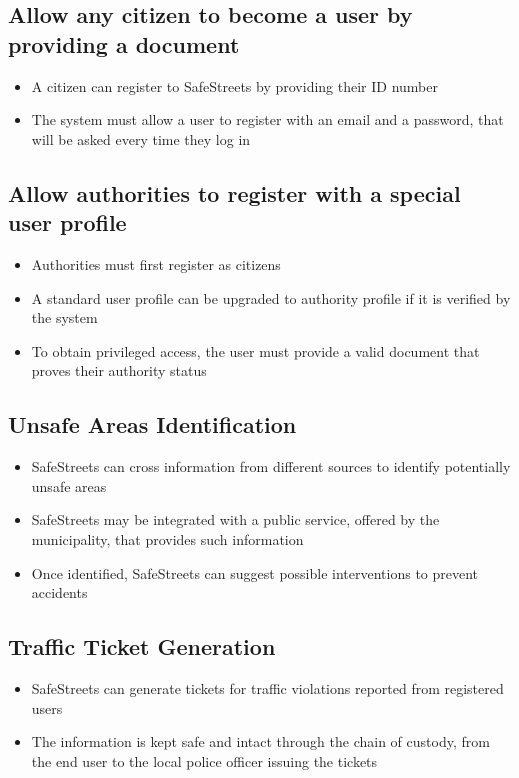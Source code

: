 \subsection{Allow any citizen to become a user by providing a document}
\begin{itemize}
    \item A citizen can register to SafeStreets by providing their ID number
    \item The system must allow a user to register with an email and a password, that will be asked every time they log in
\end{itemize}

\subsection{Allow authorities to register with a special user profile}
\begin{itemize}
    \item Authorities must first register as citizens
    \item A standard user profile can be upgraded to authority profile if it is verified by the system
    \item To obtain privileged access, the user must provide a valid document that proves their authority status
\end{itemize}

\subsection{Unsafe Areas Identification}
\begin{itemize}
  \item SafeStreets can cross information from different sources to identify potentially unsafe areas
  \item SafeStreets may be integrated with a public service, offered by the municipality, that provides such information
  \item Once identified, SafeStreets can suggest possible interventions to prevent accidents
\end{itemize}

\subsection{Traffic Ticket Generation}
\begin{itemize}
  \item SafeStreets can generate tickets for traffic violations reported from registered users
  \item The information is kept safe and intact through the chain of custody, from the end user to the local police officer issuing the tickets
\end{itemize}